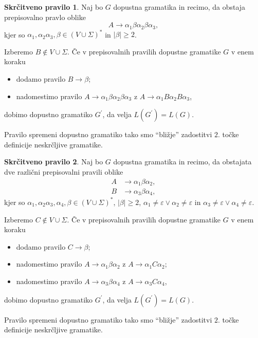 \documentclass[fin1, tisk]{fmfdelo}
\providecommand{\abs}[1]{\left\lvert #1 \right\rvert}
\theoremstyle{definition}
\newtheorem{pravilo}{Skrčitveno pravilo}
\begin{document}
\begin{pravilo}
    Naj bo $G$ dopustna gramatika in recimo, da obstaja prepisovalno pravlo oblike
    \[
        A \rightarrow \alpha_1 \beta \alpha_2 \beta \alpha_3,
    \]
    kjer so $\alpha_1, \alpha_2 \alpha_3, \beta \in (V \cup \Sigma)^*$ in $\abs{\beta} \geq 2$.

    Izberemo $B \notin V \cup \Sigma$. Če v prepisovalnih pravilih dopustne gramatike $G$ v enem koraku
    \begin{itemize}
        \item dodamo pravilo $B \rightarrow \beta$;
        \item nadomestimo pravilo $A \rightarrow \alpha_1 \beta \alpha_2 \beta \alpha_3$ z 
        $A \rightarrow \alpha_1 B \alpha_2 B \alpha_3$,
    \end{itemize}
    dobimo dopustno gramatiko $G^\prime$, da velja $L(G^\prime) = L(G)$.

    Pravilo spremeni dopustno gramatiko tako smo ``bližje'' zadostitvi $2.$ točke definicije 
    neskrčljive gramatike.
\end{pravilo}

\begin{pravilo}
    Naj bo $G$ dopustna gramatika in recimo, da obstajata dve različni prepisovalni pravili oblike
    \begin{align*}
        A &\rightarrow \alpha_1 \beta \alpha_2, \\
        B &\rightarrow \alpha_3 \beta \alpha_4,
    \end{align*}
    kjer so $\alpha_1, \alpha_2 \alpha_3, \alpha_4, \beta \in (V \cup \Sigma)^*$, $\abs{\beta} \geq 2$,
    $\alpha_1 \neq \varepsilon \vee \alpha_2 \neq \varepsilon$ in 
    $\alpha_3 \neq \varepsilon \vee \alpha_4 \neq \varepsilon$.

    Izberemo $C \notin V \cup \Sigma$. Če v prepisovalnih pravilih dopustne gramatike $G$ v enem koraku
    \begin{itemize}
        \item dodamo pravilo $C \rightarrow \beta$;
        \item nadomestimo pravilo $A \rightarrow \alpha_1 \beta \alpha_2$ 
        z $A \rightarrow \alpha_1 C \alpha_2$;
        \item nadomestimo pravilo $A \rightarrow \alpha_3 \beta \alpha_4$ 
        z $A \rightarrow \alpha_3 C \alpha_4$,
    \end{itemize}
    dobimo dopustno gramatiko $G^\prime$, da velja $L(G^\prime) = L(G)$.

    Pravilo spremeni dopustno gramatiko tako smo ``bližje'' zadostitvi $2.$ točke definicije 
    neskrčljive gramatike.
\end{pravilo}
\end{document}
